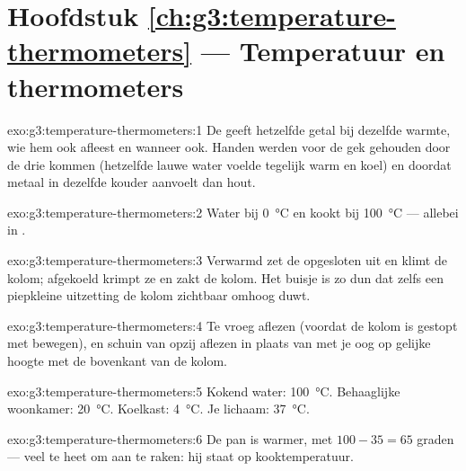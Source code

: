 \section*{Hoofdstuk \ref{ch:g3:temperature-thermometers} --- Temperatuur en thermometers}

\begin{solution}{exo:g3:temperature-thermometers:1}
De  geeft hetzelfde getal bij dezelfde warmte, wie hem ook
afleest en wanneer ook. Handen werden voor de gek gehouden door de
drie kommen (hetzelfde lauwe water voelde tegelijk warm en koel) en
doordat metaal in dezelfde  kouder aanvoelt dan hout.
\end{solution}

\begin{solution}{exo:g3:temperature-thermometers:2}
Water  bij \qty{0}{\celsius} en kookt bij
\qty{100}{\celsius} --- allebei in .
\end{solution}

\begin{solution}{exo:g3:temperature-thermometers:3}
Verwarmd zet de opgesloten  uit en klimt de kolom; afgekoeld
krimpt ze en zakt de kolom. Het buisje is zo dun dat zelfs een
piepkleine uitzetting de kolom zichtbaar omhoog duwt.
\end{solution}

\begin{solution}{exo:g3:temperature-thermometers:4}
Te vroeg aflezen (voordat de kolom is gestopt met bewegen), en schuin
van opzij aflezen in plaats van met je oog op gelijke hoogte met de
bovenkant van de kolom.
\end{solution}

\begin{solution}{exo:g3:temperature-thermometers:5}
Kokend water: \qty{100}{\celsius}. Behaaglijke woonkamer:
\qty{20}{\celsius}. Koelkast: \qty{4}{\celsius}. Je lichaam:
\qty{37}{\celsius}.
\end{solution}

\begin{solution}{exo:g3:temperature-thermometers:6}
De pan is warmer, met $100 - 35 = 65$ graden --- veel te heet om aan
te raken: hij staat op kooktemperatuur.
\end{solution}

